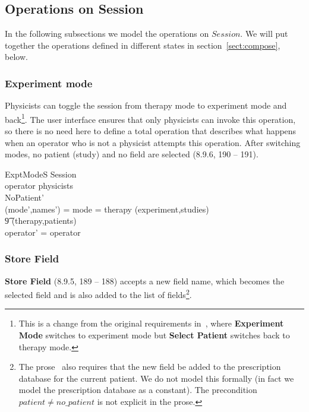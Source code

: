 \documentclass{article}
\begin{document}
\subsection{Operations on Session}

In the following subsections we model the operations on $Session$.  We
will put together the operations defined in different states in
section~\ref{sect:compose}, below.

\subsubsection{Experiment mode} \label{sect:expt-mode-s}

Physicists can toggle the session from therapy mode to experiment mode
and back\footnote{This is a change from the original requirements
in~\cite{jacky90d}, where {\bf Experiment Mode} switches to experiment
mode but {\bf Select Patient} switches back to therapy mode.}. The
user interface ensures that only physicists can invoke this operation,
so there is no need here to define a total operation that describes
what happens when an operator who is not a physicist attempts this
operation.  After switching modes, no patient (study) and no field are
selected (8.9.6, 190 -- 191).

\begin{schema}{ExptModeS}
	\Delta Session \\
\where
	operator \in physicists \\
	NoPatient' \\
	(mode',names') = \IF mode = therapy \THEN (experiment,studies) \\
\t9						\ELSE (therapy,patients) \\
	operator' = operator
\end{schema}

\subsubsection{Store Field}

{\bf Store Field} (8.9.5, 189 -- 188) accepts a new field name, which
becomes the selected field and is also added to the list of
fields\footnote{The prose~\cite{jacky92} also requires that the new
field be added to the prescription database for the current patient.
We do not model this formally (in fact we model the prescription
database as a constant).  The precondition $patient \neq no\_patient$
is not explicit in the prose.}.
\end{document}
